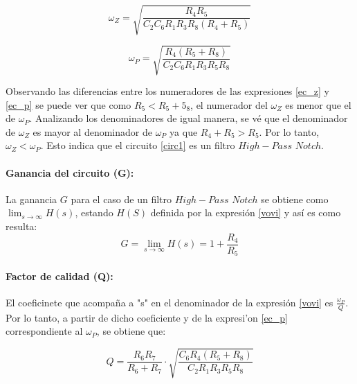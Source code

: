 \begin{equation}
	\omega_Z = \sqrt{\frac{R_4 R_5}{C_2 C_6 R_1 R_3 R_8 (R_4 + R_5)}}
	\label{ec_z}
\end{equation}

\begin{equation}
	\omega_P = \sqrt{\frac{R_4 (R_5 + R_8)}{C_2 C_6 R_1 R_3 R_5 R_8}}
	\label{ec_p}
\end{equation}

Observando las diferencias entre los numeradores de las expresiones \ref{ec_z} y \ref{ec_p} se puede ver que como $R_5 < R_5 + 5_8$, el numerador del $\omega_Z$ es menor que el de $\omega_P$. Analizando los denominadores de igual manera, se v\'e que el denominador de $\omega_Z$ es mayor al denominador de $\omega_P$ ya que $R_4 + R_5 > R_5$. Por lo tanto, $\omega_Z < \omega_P$. Esto indica que el circuito \ref{circ1} es un filtro $High-Pass$ $ Notch$.


\paragraph*{Ganancia del circuito (G):}  La ganancia $G$ para el caso de un filtro $High-Pass$ $ Notch$ se obtiene como $\lim_{s\to\infty}H(s)$, estando $H(S)$ definida por la expresi\'on \ref{vovi} y as\'i es como resulta:
 \begin{equation}
	G = \lim_{s\to\infty}H(s) = 1 + \frac{R_4}{R_5} 
\label{G}
\end{equation}

\paragraph*{Factor de calidad (Q):} El coeficinete que acompa\~na a "s" en el denominador de la expresi\'on \ref{vovi} es $\frac{\omega_P}{Q}$. Por lo tanto, a partir de dicho coeficiente y de la expresi'on \ref{ec_p} correspondiente al $\omega_P$, se obtiene que:

\begin{equation}
	Q = \frac{R_{6} R_{7}}{R_{6} + R_{7}} \cdot \sqrt{\frac{C_{6} R_{4} \left(R_{5} + R_{8}\right)}{C_{2} R_{1} R_{3}R_{5} R_{8} }}
\end{equation}
	
	
	
	
	
	